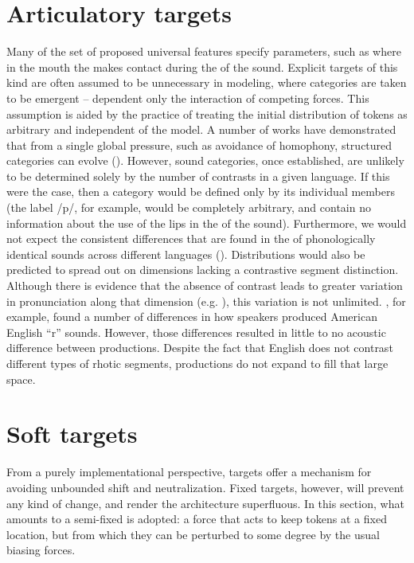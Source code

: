 \section{Articulatory targets}

Many of the set of proposed universal  features specify
 parameters, such as where in the mouth the 
makes contact during the  of the sound. Explicit targets
of this kind are often assumed to be unnecessary in  modeling,
where categories are taken to be emergent – dependent only the interaction
of competing forces. This assumption is aided by the practice of treating
the initial distribution of tokens as arbitrary and independent of
the model. A number of works have demonstrated that from a single
global pressure, such as avoidance of homophony, structured categories
can evolve (\citealt{Boer2000,Wedel2006,soskuthy2013phonetic}). However,
sound categories, once established, are unlikely to be determined
solely by the number of contrasts in a given language. If this were
the case, then a category would be defined only by its individual
members (the label {/p/}, for example, would be completely
arbitrary, and contain no information about the use of the lips in
the  of the sound). Furthermore, we would not expect the
consistent  differences that are found in the  of
phonologically identical sounds across different languages (\citealt{Keating1985}).
Distributions would also be predicted to spread out on dimensions
lacking a contrastive segment distinction. Although there is evidence
that the absence of contrast leads to greater variation in pronunciation
along that dimension (e.g. \citealt{choi1995acoustic}), this variation
is not unlimited. \citet{Baker2011}, for example, found a number
of differences in how speakers produced American English “r”
sounds. However, those differences resulted in little to no acoustic
difference between productions. Despite the fact that English does
not contrast different types of rhotic segments, productions do not
expand to fill that large  space. 

\section{\label{subsec:Soft-Targets}Soft targets}\largerpage
From a purely implementational perspective,  targets offer
a mechanism for avoiding unbounded shift and neutralization. Fixed
targets, however, will prevent any kind of change, and render the
 architecture superfluous. In this section, what amounts to
a semi-fixed  is adopted: a force that acts to keep tokens at
a fixed location, but from which they can be perturbed to some degree
by the usual biasing forces. 

